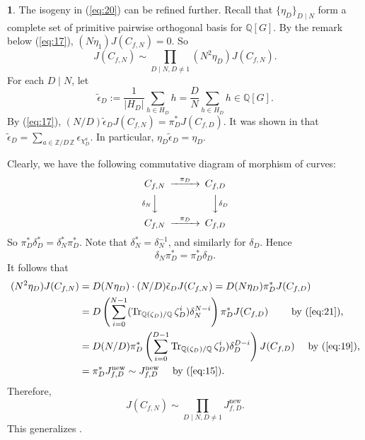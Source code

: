 \documentclass{amsart}[11pt]
\theoremstyle{definition}
\newtheorem{sect}[thm]{}
\numberwithin{equation}{section}
\theoremstyle{notitle}
\begin{document}
\begin{sect}\label{subsec:complete-decomposition-isogeny}
  The isogeny in (\ref{eq:20}) can be refined further.  Recall that
  $\{\eta_D\}_{D\mid N}$ form a complete set of primitive pairwise
  orthogonal basis for ${\mathbb{Q}}[G]$. By the remark below (\ref{eq:17}),
  $(N\eta_1)J(C_{f,N})=0$. So
\begin{equation}
  J(C_{f,N}) \sim \prod_{D\mid N, D\neq 1} (N^2\eta_D)J(C_{f,N}). 
\end{equation}
For each $D\mid
  N$, let \[\tilde{\epsilon}_D:=\frac{1}{{\lvert {H_D} \rvert}}\sum_{h\in H_D}
  h=\frac{D}{N}\sum_{h\in H_D} h\in {\mathbb{Q}}[G].\] By (\ref{eq:17}),
  $(N/D)\tilde{\epsilon}_DJ(C_{f,N})= \pi_D^*J(C_{f,D})$. It was shown
  in \cite[Lemma~5.2]{MR1708603} that $\tilde{\epsilon}_D=\sum_{a\in
    {\mathbb{Z}/ {D}\, \mathbb{Z}}} \epsilon_{\chi_D^a}$. In particular, $\eta_D
  \tilde{\epsilon}_D =\eta_D$.

Clearly, we have the following commutative diagram of morphism of
curves: 
\begin{equation}
  \label{eq:18}
  \begin{CD}
    C_{f,N}@>{\pi_D}>> C_{f,D}\\
    @V{\delta_N}VV  @VV{\delta_D}V\\
    C_{f,N}@>{\pi_D}>> C_{f,D}\\
  \end{CD}
\end{equation}
So $\pi_D^* \delta_D^*=\delta_N^* \pi_D^*$. Note that
$\delta_N^*=\delta_N^{-1}$, and similarly for $\delta_D$. Hence
\begin{equation}
  \label{eq:19}
  \delta_N \pi_D^*= \pi_D^* \delta_D. 
\end{equation}
It follows that 
\[
\begin{split}
(N^2\eta_D)J(C_{f,N})&= D(N\eta_D)\cdot (N/D)\tilde{\epsilon}_DJ(C_{f,N})=
D(N\eta_D)\pi_D^*J(C_{f,D})\\ 
&=D \left(\sum_{i=0}^{N-1}
(\operatorname{Tr}_{{\mathbb{Q}}(\zeta_D)/{\mathbb{Q}}}\zeta_D^i) \delta_N^{N-i}
\right)\pi_D^*J(C_{f,D})\qquad \text{ by (\ref{eq:21}),}\\
 &=D (N/D)\pi_D^*\left(\sum_{i=0}^{D-1}\operatorname{Tr}_{{\mathbb{Q}}(\zeta_D)/{\mathbb{Q}}}\zeta_D^i)
   \delta_D^{D-i}\right)J(C_{f,D})   \quad \text{ by (\ref{eq:19}),}\\
&= \pi_D^*J_{f,D}^{\mathrm{new}}\sim J_{f,D}^{\mathrm{new}}  \quad \text{ by (\ref{eq:15})}. 
\end{split}
 \]
Therefore, 
\begin{equation}
  \label{eq:22}
  J(C_{f,N}) \sim
  \prod_{D\mid N, D\neq 1} J_{f,D}^{\mathrm{new}}. 
\end{equation}
This generalizes \cite[Corollary 4.12]{MR2166091}. 
\end{sect}
\end{document}
